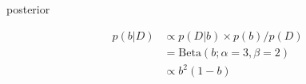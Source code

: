 \documentclass[t]{beamer}
\begin{document}
\begin{frame}
  \begin{minipage}{0.1\paperwidth}
    posterior
  \end{minipage}
  \begin{minipage}{0.3\paperwidth}
    \begin{align*}
      p(b|D) &\propto p(D|b)\times p(b) / p(D)\\
             &=\mathrm{Beta}(b; \alpha=3, \beta=2) \\
             &\propto b^2(1-b)
    \end{align*}
  \end{minipage}
  \begin{minipage}[t]{0.3\paperwidth}
  \begin{adjustbox}{width=0.7\textwidth}
    \end{adjustbox}
  \end{minipage}
\end{frame}
\end{document}
